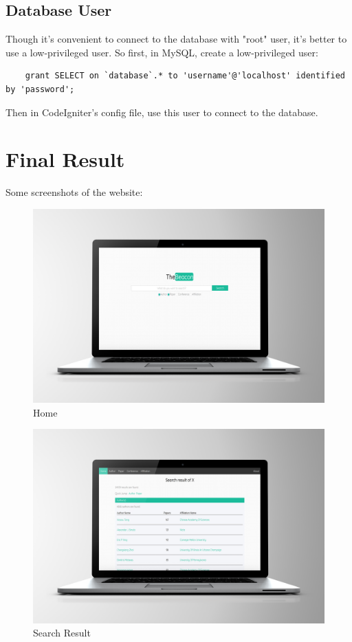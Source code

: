\documentclass[a4paper]{article}
\begin{document}
        \subsection{Database User}
Though it's convenient to connect to the database with "root" user, it's better to use a low-privileged user.
So first, in MySQL, create a low-privileged user:
\begin{verbatim}
    grant SELECT on `database`.* to 'username'@'localhost' identified by 'password'; 
\end{verbatim}
Then in CodeIgniter's config file, use this user to connect to the database.
    \newpage
    \section{Final Result}
Some screenshots of the website:
            \begin{figure}[H]
            \centering
            \includegraphics[width=.8\textwidth]{img/img6.jpg}
            \caption{Home}
            \end{figure}
                        \begin{figure}[H]
            \centering
            \includegraphics[width=.8\textwidth]{img/img7.jpg}
            \caption{Search Result}
            \end{figure}
\end{document}
